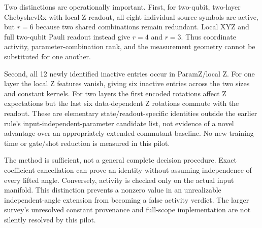 Two distinctions are operationally important. First, for two-qubit,
two-layer ChebyshevRx with local Z readout, all eight individual source
symbols are active, but $r=6$ because two shared combinations remain
redundant. Local XYZ and full two-qubit Pauli readout instead give
$r=4$ and $r=3$. Thus coordinate activity, parameter-combination rank,
and the measurement geometry cannot be substituted for one another.

Second, all 12 newly identified inactive entries occur in ParamZ/local Z.
For one layer the local Z features vanish, giving six inactive entries
across the two sizes and constant kernels. For two layers the first
encoded rotations affect Z expectations but the last six data-dependent
Z rotations commute with the readout. These are elementary
state/readout-specific identities outside the earlier rule's
input-independent-parameter candidate list, not evidence of a novel
advantage over an appropriately extended commutant baseline.
No new training-time or gate/shot reduction is measured in this pilot.

The method is sufficient, not a general complete decision procedure.
Exact coefficient cancellation can prove an identity without assuming
independence of every lifted angle. Conversely, activity is checked only
on the actual input manifold. This distinction prevents a nonzero value
in an unrealizable independent-angle extension from becoming a false
activity verdict. The larger survey's unresolved constant provenance
and full-scope implementation are not silently resolved by this pilot.
